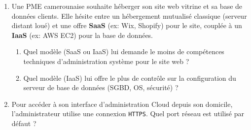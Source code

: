 \documentclass[11pt]{article}
\begin{document}
\begin{exercice}
\begin{enumerate}
    \item Une PME camerounaise souhaite héberger son site web vitrine et sa base de données clients. Elle hésite entre un hébergement mutualisé classique (serveur distant loué) et une offre \textbf{SaaS} (ex: Wix, Shopify) pour le site, couplée à un \textbf{IaaS} (ex: AWS EC2) pour la base de données.
    \begin{enumerate}
        \item Quel modèle (SaaS ou IaaS) lui demande le moins de compétences techniques d'administration système pour le site web ?
        \item Quel modèle (IaaS) lui offre le plus de contrôle sur la configuration du serveur de base de données (SGBD, OS, sécurité) ?
    \end{enumerate}
    \item Pour accéder à son interface d'administration Cloud depuis son domicile, l'administrateur utilise une connexion \texttt{HTTPS}. Quel port réseau est utilisé par défaut ?
\end{enumerate}
\end{exercice}
\end{document}
